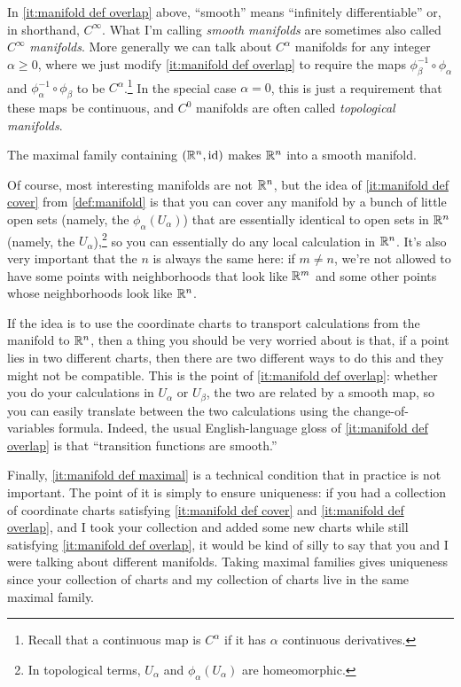 \begin{remark}
	In \ref{it:manifold def overlap} above, ``smooth'' means ``infinitely differentiable'' or, in shorthand, $C^\infty$. What I'm calling \emph{smooth manifolds} are sometimes also called $C^\infty$ \emph{manifolds}. More generally we can talk about $C^\alpha$ manifolds for any integer $\alpha \geq 0$, where we just modify \ref{it:manifold def overlap} to require the maps $\phi_\beta^{-1} \circ \phi_\alpha$ and $\phi_\alpha^{-1} \circ \phi_\beta$ to be $C^\alpha$.\footnote{Recall that a continuous map is $C^\alpha$ if it has $\alpha$ continuous derivatives.} In the special case $\alpha = 0$, this is just a requirement that these maps be continuous, and $C^0$ manifolds are often called \emph{topological manifolds}.
\end{remark}

\begin{example}
	The maximal family containing $(\mathbb{R}^n, \operatorname{id})$ makes $\mathbb{R}^n$ into a smooth manifold.
\end{example}

Of course, most interesting manifolds are not $\mathbb{R}^n$, but the idea of \ref{it:manifold def cover} from \cref{def:manifold} is that you can cover any manifold by a bunch of little open sets (namely, the $\phi_\alpha(U_\alpha)$) that are essentially identical to open sets in $\mathbb{R}^n$ (namely, the $U_\alpha$),\footnote{In topological terms, $U_\alpha$ and $\phi_\alpha(U_\alpha)$ are homeomorphic.} so you can essentially do any local calculation in $\mathbb{R}^n$. It's also very important that the $n$ is always the same here: if $m \neq n$, we're not allowed to have some points with neighborhoods that look like $\mathbb{R}^m$ and some other points whose neighborhoods look like $\mathbb{R}^n$.

If the idea is to use the coordinate charts to transport calculations from the manifold to $\mathbb{R}^n$, then a thing you should be very worried about is that, if a point lies in two different charts, then there are two different ways to do this and they might not be compatible. This is the point of \ref{it:manifold def overlap}: whether you do your calculations in $U_\alpha$ or $U_\beta$, the two are related by a smooth map, so you can easily translate between the two calculations using the change-of-variables formula. Indeed, the usual English-language gloss of \ref{it:manifold def overlap} is that ``transition functions are smooth.''

Finally, \ref{it:manifold def maximal} is a technical condition that in practice is not important. The point of it is simply to ensure uniqueness: if you had a collection of coordinate charts satisfying \ref{it:manifold def cover} and \ref{it:manifold def overlap}, and I took your collection and added some new charts while still satisfying \ref{it:manifold def overlap}, it would be kind of silly to say that you and I were talking about different manifolds. Taking maximal families gives uniqueness since your collection of charts and my collection of charts live in the same maximal family.


